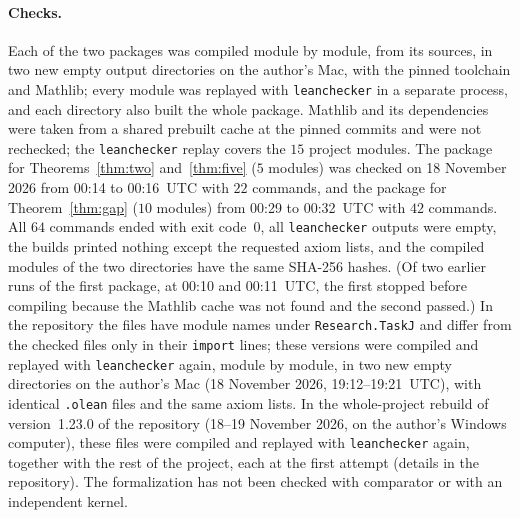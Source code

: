 \documentclass[11pt]{article}
\theoremstyle{remark}
\begin{document}
\paragraph{Checks.}
Each of the two packages was compiled module by module, from its sources, in
two new empty output directories on the author's Mac, with the pinned
toolchain and Mathlib; every module was replayed with \texttt{leanchecker} in
a separate process, and each directory also built the whole package. Mathlib
and its dependencies were taken from a shared prebuilt cache at the pinned
commits and were not rechecked; the \texttt{leanchecker} replay covers the
$15$ project modules. The package for Theorems~\ref{thm:two}
and~\ref{thm:five} ($5$ modules) was checked on 18 November 2026 from 00:14 to
00:16~UTC with $22$ commands, and the package for Theorem~\ref{thm:gap}
($10$ modules) from 00:29 to 00:32~UTC with $42$ commands. All $64$ commands
ended with exit code~$0$, all \texttt{leanchecker} outputs were empty, the
builds printed nothing except the requested axiom lists, and the compiled
modules of the two directories have the same SHA-256 hashes. (Of two earlier runs of the
first package, at 00:10 and 00:11~UTC, the first stopped before compiling
because the Mathlib cache was not found and the second passed.)
In the repository the files have module names under \texttt{Research.TaskJ} and differ from the checked files only in their \texttt{import} lines; these versions were compiled and replayed with \texttt{leanchecker} again, module by module, in two new empty directories on the author's Mac (18 November 2026, 19:12--19:21~UTC), with identical \texttt{.olean} files and the same axiom lists. In the whole-project rebuild of version~1.23.0 of the repository (18--19 November 2026, on the author's Windows computer), these files were compiled and replayed with \texttt{leanchecker} again, together with the rest of the project, each at the first attempt (details in the repository). The formalization has not been checked with comparator or with
an independent kernel.
\end{document}
